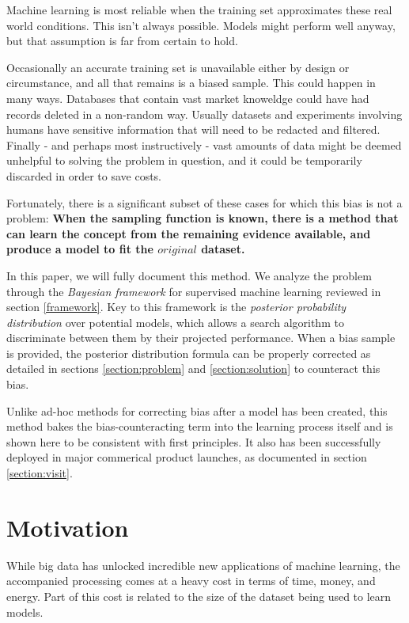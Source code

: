 \documentclass[twoside]{article}
\begin{document}
Machine learning is most reliable when the training set approximates these real world conditions. This isn't always possible. Models might perform well anyway, but that assumption is far from certain to hold.

Occasionally an accurate training set is unavailable either by design or circumstance, and all that remains is a biased sample. This could happen in many ways. Databases that contain vast market knoweldge could have had records deleted in a non-random way. Usually datasets and experiments involving humans have sensitive information that will need to be redacted and filtered. Finally - and perhaps most instructively - vast amounts of data might be deemed unhelpful to solving the problem in question, and it could be temporarily discarded in order to save costs.

Fortunately, there is a significant subset of these cases for which this bias is not a problem: \textbf{When the sampling function is known, there is a method that can learn the concept from the remaining evidence available, and produce a model to fit the \(original\) dataset.}

In this paper, we will fully document this method. We analyze the problem through the \textit{Bayesian framework} for supervised machine learning reviewed in section \ref{framework}. Key to this framework is the \textit{posterior probability distribution} over potential models, which allows a search algorithm to discriminate between them by their projected performance. When a bias sample is provided, the posterior distribution formula can be properly corrected as detailed in sections \ref{section:problem} and \ref{section:solution} to counteract this bias.

Unlike ad-hoc methods for correcting bias after a model has been created, this method bakes the bias-counteracting term into the learning process itself and is shown here to be consistent with first principles. It also has been successfully deployed in major commerical product launches, as documented in section \ref{section:visit}.

\section{Motivation}

While big data has unlocked incredible new applications of machine learning, the accompanied processing comes at a heavy cost in terms of time, money, and energy. Part of this cost is related to the size of the dataset being used to learn models.
\end{document}
